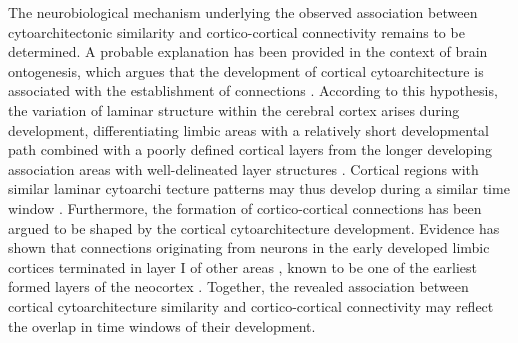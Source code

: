 \begin{refsection}
The neurobiological mechanism underlying the observed association between cytoarchitectonic similarity and cortico-cortical connectivity remains to be determined. A probable explanation has been provided in the context of brain ontogenesis, which argues that the development of cortical cytoarchitecture is associated with the establishment of connections \citep{barbas2015general,beul2017predictive,beul2015predictive,goulas2016cytoarchitectonic,goulas2017principles}. According to this hypothesis, the variation of laminar structure within the cerebral cortex arises during development, differentiating limbic areas with a relatively short developmental path combined with a poorly defined cortical layers from the longer developing association areas with well-delineated layer structures \citep{Barbas2016HowTP}. Cortical regions with similar laminar cytoarchi tecture patterns may thus develop during a similar time window \citep{barbas2015general,beul2017predictive,beul2015predictive,goulas2016cytoarchitectonic,goulas2017principles}. Furthermore, the formation of cortico-cortical connections has been argued to be shaped by the cortical cytoarchitecture development. Evidence has shown that connections originating from neurons in the early developed limbic cortices terminated in layer I of other areas \citep{barbas2015general}, known to be one of the earliest formed layers of the neocortex \citep{MarnPadilla1970PrenatalAE}. Together, the revealed association between cortical cytoarchitecture similarity and cortico-cortical connectivity may reflect the overlap in time windows of their development.\\


\end{refsection}
